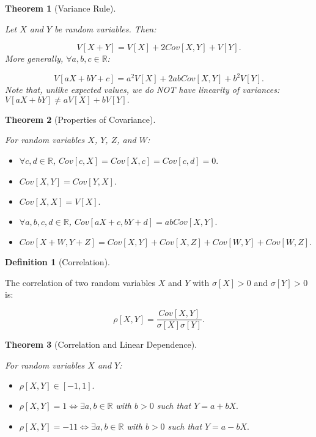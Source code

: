 \documentclass[
]{article}
\providecommand{\tightlist}{%
  \setlength{\itemsep}{0pt}\setlength{\parskip}{0pt}}
\newtheorem{theorem}{Theorem}[section]
\theoremstyle{definition}
\newtheorem{definition}{Definition}[section]
\theoremstyle{definition}
\theoremstyle{definition}
\theoremstyle{remark}
\begin{document}
\begin{theorem}[Variance Rule]
\protect\hypertarget{thm:unlabeled-div-82}{}\label{thm:unlabeled-div-82}

Let \(X\) and \(Y\) be random variables. Then:

\[V[X + Y] = V[X] + 2Cov[X,Y] + V[Y].\]
More generally, \(\forall a,b,c \in \mathbb{R}\):

\[V[aX + bY + c] = a^2V[X] + 2abCov[X,Y] + b^2V[Y].\]
Note that, unlike expected values, we do NOT have linearity of variances: \(V[aX + bY] \neq aV[X] + bV[Y].\)

\end{theorem}

\begin{theorem}[Properties of Covariance]
\protect\hypertarget{thm:unlabeled-div-83}{}\label{thm:unlabeled-div-83}

For random variables \(X\), \(Y\), \(Z\), and \(W\):

\begin{itemize}
\tightlist
\item
  \(\forall c,d \in \mathbb{R}\), \(Cov[c,X] = Cov[X,c] = Cov[c,d] = 0.\)
\item
  \(Cov[X,Y] = Cov[Y,X].\)
\item
  \(Cov[X,X] = V[X].\)
\item
  \(\forall a,b,c,d \in \mathbb{R}\), \(Cov[aX + c, bY + d] = abCov[X,Y].\)
\item
  \(Cov[X + W, Y + Z] = Cov[X,Y] + Cov[X,Z] + Cov[W,Y] + Cov[W,Z].\)
\end{itemize}

\end{theorem}

\begin{definition}[Correlation]
\protect\hypertarget{def:unlabeled-div-84}{}\label{def:unlabeled-div-84}

The correlation of two random variables \(X\) and \(Y\) with \(\sigma[X] > 0\) and \(\sigma[Y] > 0\) is:

\[\rho[X,Y] = \frac{Cov[X,Y]}{\sigma[X]\sigma[Y]}.\]

\end{definition}

\begin{theorem}[Correlation and Linear Dependence]
\protect\hypertarget{thm:unlabeled-div-85}{}\label{thm:unlabeled-div-85}

For random variables \(X\) and \(Y\):

\begin{itemize}
\tightlist
\item
  \(\rho[X,Y] \in [-1,1].\)
\item
  \(\rho[X,Y] = 1 \iff \exists a,b \in \mathbb{R}\) with \(b > 0\) such that \(Y = a + bX.\)
\item
  \(\rho[X,Y] = -11 \iff \exists a,b \in \mathbb{R}\) with \(b > 0\) such that \(Y = a - bX.\)
\end{itemize}

\end{theorem}
\end{document}
